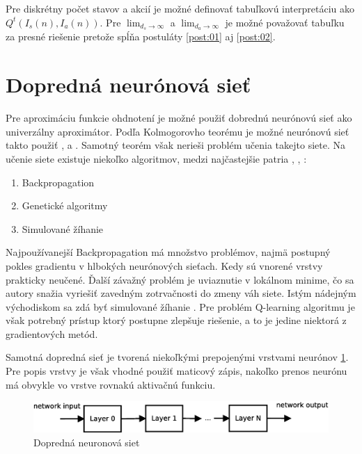 Pre diskrétny počet stavov a akcií je možné definovať tabuľkovú interpretáciu ako
$Q^t(I_s(n), I_a(n))$.
Pre $\lim_{d_s\to\infty}$ a $\lim_{d_a\to\infty}$ je možné považovať tabuľku za presné riešenie
pretože spĺňa postuláty \ref{post:01} aj \ref{post:02}.

\section{Dopredná neurónová sieť}

Pre aproximáciu funkcie ohdnotení je možné použiť dobrednú neurónovú sieť ako
univerzálny aproximátor. Podľa Kolmogorovho teorému je možné neurónovú sieť
takto použiť \cite{bib:kolomongorov_01}, \cite{bib:kolomongorov_02} a \cite{bib:kolomongorov_03}.
Samotný teorém však nerieši problém učenia takejto siete. Na učenie siete
existuje niekoľko algoritmov, medzi najčastejšie patria
\cite{bib:backpropagation_00}, \cite{bib:backpropagation_01}, \cite{bib:backpropagation_02} :

\begin{enumerate}
 \item Backpropagation
 \item Genetické algoritmy
 \item Simulované žíhanie
\end{enumerate}

Najpoužívanejší Backpropagation má množstvo problémov, najmä postupný pokles gradientu
v hlbokých neurónových sieťach. Kedy sú vnorené vrstvy prakticky neučené. Ďalší závažný problém
je uviaznutie v lokálnom minime, čo sa autory snažia vyriešiť zavedným zotrvačnosti
do zmeny váh siete. Istým nádejným východiskom sa zdá byť simulované žíhanie \cite{bib:annealing_01}.
Pre problém Q-learning algoritmu je však potrebný prístup ktorý postupne zlepšuje riešenie,
a to je jedine niektorá z gradientových metód.

Samotná dopredná sieť je tvorená niekoľkými prepojenými vrstvami neurónov \ref{img:ffnn}.
Pre popis vrstvy je však vhodné použiť maticový zápis, nakoľko prenos neurónu má
obvykle vo vrstve rovnakú aktivačnú funkciu.

\begin{figure}[!htb]
\center
\includegraphics[scale=.6]{../diagrams/neural_layers.eps}
\caption{Dopredná neuronová siet}
\label{img:ffnn}
\end{figure}

